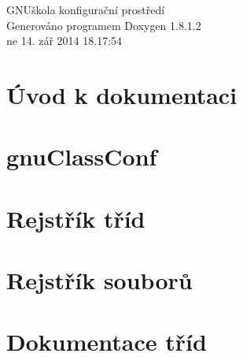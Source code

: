 \documentclass{book}
\begin{document}
\hypersetup{pageanchor=false,citecolor=blue}
\begin{titlepage}
\vspace*{7cm}
\begin{center}
{\Large G\-N\-Uškola konfigurační prostředí }\\
\vspace*{1cm}
{\large Generováno programem Doxygen 1.8.1.2}\\
\vspace*{0.5cm}
{\small ne 14. zář 2014 18.17:54}\\
\end{center}
\end{titlepage}
\clearemptydoublepage
{}
\tableofcontents
\clearemptydoublepage
{}
\hypersetup{pageanchor=true,citecolor=blue}
\chapter{Úvod k dokumentaci}
\label{index}\hypertarget{index}{}
\chapter{gnu\-Class\-Conf}
\label{md_README}
\hypertarget{md_README}{}

\chapter{Rejstřík tříd}

\chapter{Rejstřík souborů}

\chapter{Dokumentace tříd}






























\end{document}
